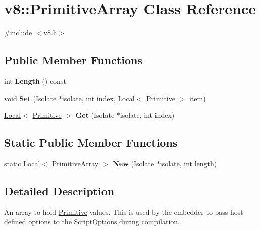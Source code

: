 \hypertarget{classv8_1_1PrimitiveArray}{}\section{v8\+:\+:Primitive\+Array Class Reference}
\label{classv8_1_1PrimitiveArray}


{\ttfamily \#include $<$v8.\+h$>$}

\subsection*{Public Member Functions}
\begin{DoxyCompactItemize}
\item 
\mbox{\label{classv8_1_1PrimitiveArray_a7e51b026e03b0a4ab3c3bec4676dfd9e}} 
int {\bfseries Length} () const
\item 
\mbox{\label{classv8_1_1PrimitiveArray_af857e95d15c32fdab2e48b8e202a7dfb}} 
void {\bfseries Set} (Isolate $\ast$isolate, int index, \mbox{\hyperlink{classv8_1_1Local}{Local}}$<$ \mbox{\hyperlink{classv8_1_1Primitive}{Primitive}} $>$ item)
\item 
\mbox{\label{classv8_1_1PrimitiveArray_a17adb353f475bdfcb579250389c7bff1}} 
\mbox{\hyperlink{classv8_1_1Local}{Local}}$<$ \mbox{\hyperlink{classv8_1_1Primitive}{Primitive}} $>$ {\bfseries Get} (Isolate $\ast$isolate, int index)
\end{DoxyCompactItemize}
\subsection*{Static Public Member Functions}
\begin{DoxyCompactItemize}
\item 
\mbox{\label{classv8_1_1PrimitiveArray_afdb183e117929fa286e0311c51ff8693}} 
static \mbox{\hyperlink{classv8_1_1Local}{Local}}$<$ \mbox{\hyperlink{classv8_1_1PrimitiveArray}{Primitive\+Array}} $>$ {\bfseries New} (Isolate $\ast$isolate, int length)
\end{DoxyCompactItemize}


\subsection{Detailed Description}
An array to hold \mbox{\hyperlink{classv8_1_1Primitive}{Primitive}} values. This is used by the embedder to pass host defined options to the Script\+Options during compilation.

